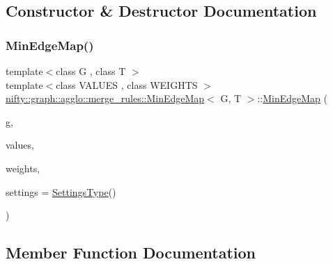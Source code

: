 \subsection{Constructor \& Destructor Documentation}
\mbox{\label{classnifty_1_1graph_1_1agglo_1_1merge__rules_1_1MinEdgeMap_a33bca71988a8f653bcdd7a484108739c}} 
\subsubsection{\texorpdfstring{Min\+Edge\+Map()}{MinEdgeMap()}}
{\footnotesize\ttfamily template$<$class G , class T $>$ \\
template$<$class V\+A\+L\+U\+ES , class W\+E\+I\+G\+H\+TS $>$ \\
\hyperlink{classnifty_1_1graph_1_1agglo_1_1merge__rules_1_1MinEdgeMap}{nifty\+::graph\+::agglo\+::merge\+\_\+rules\+::\+Min\+Edge\+Map}$<$ G, T $>$\+::\hyperlink{classnifty_1_1graph_1_1agglo_1_1merge__rules_1_1MinEdgeMap}{Min\+Edge\+Map} (\begin{DoxyParamCaption}\item[{const \hyperlink{classnifty_1_1graph_1_1agglo_1_1merge__rules_1_1MinEdgeMap_aad794908266d5bf105eea1c117ffb70f}{Graph\+Type} \&}]{g,  }\item[{const V\+A\+L\+U\+ES \&}]{values,  }\item[{const W\+E\+I\+G\+H\+TS \&}]{weights,  }\item[{const \hyperlink{classnifty_1_1graph_1_1agglo_1_1merge__rules_1_1MinEdgeMap_ad0dd446b81440917b4dd852bd6bf1dac}{Settings\+Type} \&}]{settings = {\ttfamily \hyperlink{classnifty_1_1graph_1_1agglo_1_1merge__rules_1_1MinEdgeMap_ad0dd446b81440917b4dd852bd6bf1dac}{Settings\+Type}()} }\end{DoxyParamCaption})\hspace{0.3cm}{\ttfamily [inline]}}



\subsection{Member Function Documentation}
\mbox{\label{classnifty_1_1graph_1_1agglo_1_1merge__rules_1_1MinEdgeMap_ac1b3149beed05cf3510f4ae4ea8273f5}} 
